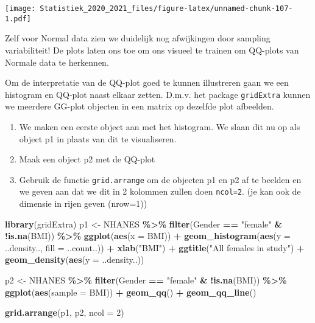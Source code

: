 \documentclass[
  12pt,dutch,coursenotes]{book}
\newenvironment{Shaded}{\begin{snugshade}}{\end{snugshade}}
\newcommand{\DataTypeTok}[1]{\textcolor[rgb]{0.13,0.29,0.53}{#1}}
\newcommand{\DecValTok}[1]{\textcolor[rgb]{0.00,0.00,0.81}{#1}}
\newcommand{\KeywordTok}[1]{\textcolor[rgb]{0.13,0.29,0.53}{\textbf{#1}}}
\newcommand{\NormalTok}[1]{#1}
\newcommand{\OperatorTok}[1]{\textcolor[rgb]{0.81,0.36,0.00}{\textbf{#1}}}
\newcommand{\StringTok}[1]{\textcolor[rgb]{0.31,0.60,0.02}{#1}}
\providecommand{\tightlist}{%
  \setlength{\itemsep}{0pt}\setlength{\parskip}{0pt}}
\theoremstyle{definition}
\theoremstyle{definition}
\theoremstyle{definition}
\theoremstyle{remark}
\begin{document}
\texttt{[image: Statistiek\_2020\_2021\_files/figure-latex/unnamed-chunk-107-1.pdf]}

Zelf voor Normal data zien we duidelijk nog afwijkingen door sampling variabiliteit! De plots laten ons toe om ons visueel te trainen om QQ-plots van Normale data te herkennen.

Om de interpretatie van de QQ-plot goed te kunnen illustreren gaan we een histogram en QQ-plot naast elkaar zetten.
D.m.v. het package \texttt{gridExtra} kunnen we meerdere GG-plot objecten in een matrix op dezelfde plot afbeelden.

\begin{enumerate}
\def\labelenumi{\arabic{enumi}.}
\tightlist
\item
  We maken een eerste object aan met het histogram. We slaan dit nu op als object p1 in plaats van dit te visualiseren.
\item
  Maak een object p2 met de QQ-plot
\item
  Gebruik de functie \texttt{grid.arrange} om de objecten p1 en p2 af te beelden en we geven aan dat we dit in 2 kolommen zullen doen \texttt{ncol=2}. (je kan ook de dimensie in rijen geven (nrow=1))
\end{enumerate}

\begin{Shaded}
\begin{Highlighting}[]
\KeywordTok{library}\NormalTok{(gridExtra)}
\NormalTok{p1 \textless{}{-}}\StringTok{ }\NormalTok{NHANES }\OperatorTok{\%\textgreater{}\%}\StringTok{ }\KeywordTok{filter}\NormalTok{(Gender }\OperatorTok{==}\StringTok{ "female"} \OperatorTok{\&}\StringTok{ }\OperatorTok{!}\KeywordTok{is.na}\NormalTok{(BMI)) }\OperatorTok{\%\textgreater{}\%}\StringTok{ }
\StringTok{    }\KeywordTok{ggplot}\NormalTok{(}\KeywordTok{aes}\NormalTok{(}\DataTypeTok{x =}\NormalTok{ BMI)) }\OperatorTok{+}\StringTok{ }\KeywordTok{geom\_histogram}\NormalTok{(}\KeywordTok{aes}\NormalTok{(}\DataTypeTok{y =}\NormalTok{ ..density.., }
    \DataTypeTok{fill =}\NormalTok{ ..count..)) }\OperatorTok{+}\StringTok{ }\KeywordTok{xlab}\NormalTok{(}\StringTok{"BMI"}\NormalTok{) }\OperatorTok{+}\StringTok{ }\KeywordTok{ggtitle}\NormalTok{(}\StringTok{"All females in study"}\NormalTok{) }\OperatorTok{+}\StringTok{ }
\StringTok{    }\KeywordTok{geom\_density}\NormalTok{(}\KeywordTok{aes}\NormalTok{(}\DataTypeTok{y =}\NormalTok{ ..density..))}

\NormalTok{p2 \textless{}{-}}\StringTok{ }\NormalTok{NHANES }\OperatorTok{\%\textgreater{}\%}\StringTok{ }\KeywordTok{filter}\NormalTok{(Gender }\OperatorTok{==}\StringTok{ "female"} \OperatorTok{\&}\StringTok{ }\OperatorTok{!}\KeywordTok{is.na}\NormalTok{(BMI)) }\OperatorTok{\%\textgreater{}\%}\StringTok{ }
\StringTok{    }\KeywordTok{ggplot}\NormalTok{(}\KeywordTok{aes}\NormalTok{(}\DataTypeTok{sample =}\NormalTok{ BMI)) }\OperatorTok{+}\StringTok{ }\KeywordTok{geom\_qq}\NormalTok{() }\OperatorTok{+}\StringTok{ }\KeywordTok{geom\_qq\_line}\NormalTok{()}

\KeywordTok{grid.arrange}\NormalTok{(p1, p2, }\DataTypeTok{ncol =} \DecValTok{2}\NormalTok{)}
\end{Highlighting}
\end{Shaded}
\end{document}
